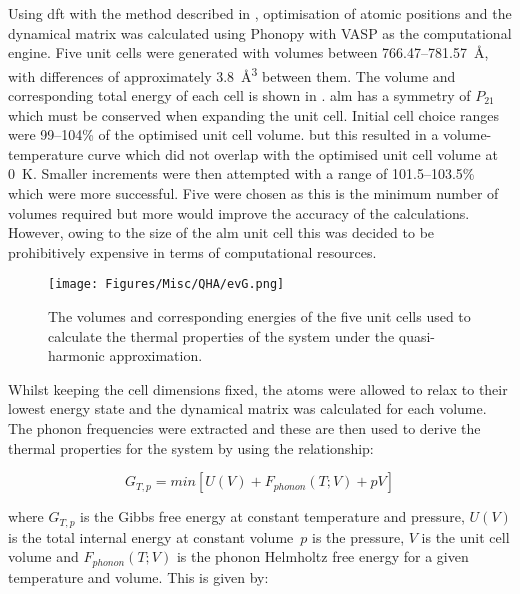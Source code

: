 Using \acrshort{dft} with the method described in , \DIFdelbegin {}\DIFdelend \DIFaddbegin {}\DIFaddend optimisation of atomic positions \DIFdelbegin {}\DIFdelend and the dynamical matrix was calculated using Phonopy with VASP as the computational engine. Five unit cells were generated with volumes between 766.47\nobreakdash--\SI{781.57}{\angstrom}, with differences of approximately \SI{3.8}{\angstrom^3} between them.  The volume and corresponding total energy of each cell is shown in . \acrshort{alm} has a symmetry of \(P_{21}\) which must be conserved when expanding the unit cell. Initial cell choice ranges were 99\nobreakdash--104\% of the optimised unit cell volume. but this resulted in a volume\nobreakdash-temperature curve which did not overlap with the optimised unit cell volume at \SI{0}{K}. Smaller increments were then attempted with a range of 101.5\nobreakdash--103.5\% which were more successful. Five were chosen as this is the minimum number of volumes required but more would improve the accuracy of the calculations. However, owing to the size of the \acrshort{alm} unit cell this was decided to be prohibitively expensive in terms of computational resources.

\begin{figure}[h]
\centering
\texttt{[image: Figures/Misc/QHA/evG.png]}
\captionsetup{font = footnotesize, justification = centering}
\caption[The Selected Volumes and Corresponding Energies used for the Quasi-Harmonic Approximation]{The volumes and corresponding energies of the five unit cells used to calculate the thermal properties of the system under the quasi-harmonic approximation.}
\label{fig:ev}
\end{figure}

Whilst keeping the cell dimensions fixed, the atoms were allowed to relax to their lowest energy state and the dynamical matrix was calculated for each volume. The phonon frequencies were extracted and these are then used to derive the thermal properties for the system by using the relationship:

\begin{equation}
G_{T,p} = min[U(V) + F_{phonon}(T;V) + pV]
\label{eqn:qha_G}
\end{equation}


where \(G_{T,p}\) is the Gibbs free energy at constant temperature and pressure, \(U(V)\) is the total internal energy at constant volume\ \(p\) is the pressure, \(V\) is the unit cell volume and \(F_{phonon}(T;V)\) is the phonon Helmholtz free energy for a given temperature and volume. This is given by:

